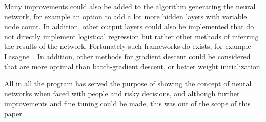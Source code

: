 \documentclass{article}
\begin{document}
Many improvements could also be added to the algorithm generating the neural network, for example an option to add a lot more hidden layers with variable node count. In addition, other output layers could also be implemented that do not directly implement logistical regression but rather other methods of inferring the results of the network. Fortunately such frameworks do exists, for example Lasagne~\cite{lasagne}. In addition, other methods for gradient descent could be considered that are more optimal than batch-gradient descent, or better weight initialization.

All in all the program has served the purpose of showing the concept of neural networks when faced with people and risky decisions, and although further improvements and fine tuning could be made, this was out of the scope of this paper.
\end{document}
